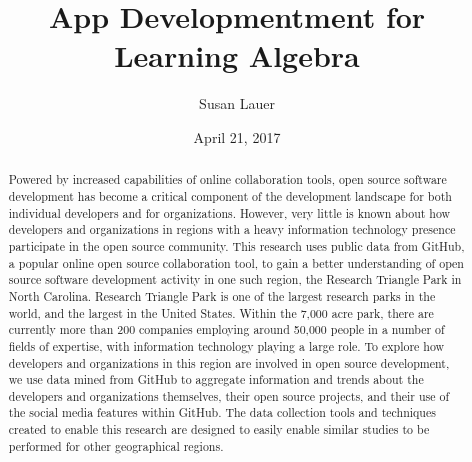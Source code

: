 \documentclass{ecuthesis}
\title{App Developmentment for Learning Algebra}
\author{Susan Lauer}
\date{April 21, 2017}
\begin{document}
\begin{abstract}
\noindent Powered by increased capabilities of online collaboration tools, open source software development has become a critical component of the development landscape for both individual developers and for organizations. However, very little is known about how developers and organizations in regions with a heavy information technology presence participate in the open source community. This research uses public data from GitHub, a popular online open source collaboration tool, to gain a better understanding of open source software development activity in one such region, the Research Triangle Park in North Carolina. Research Triangle Park is one of the largest research parks in the world, and the largest in the United States. Within the 7,000 acre park, there are currently more than 200 companies employing around 50,000 people in a number of fields of expertise, with information technology playing a large role. To explore how developers and organizations in this region are involved in open source development, we use data mined from GitHub to aggregate information and trends about the developers and organizations themselves, their open source projects, and their use of the social media features within GitHub. The data collection tools and techniques created to enable this research are designed to easily enable similar studies to be performed for other geographical regions.
\end{abstract}

\coversheet

\maketitle
\makecopyright
\makesignature
\tableofcontents
\listoftables
\listoffigures

\chapters













\coversheet
\end{document}
